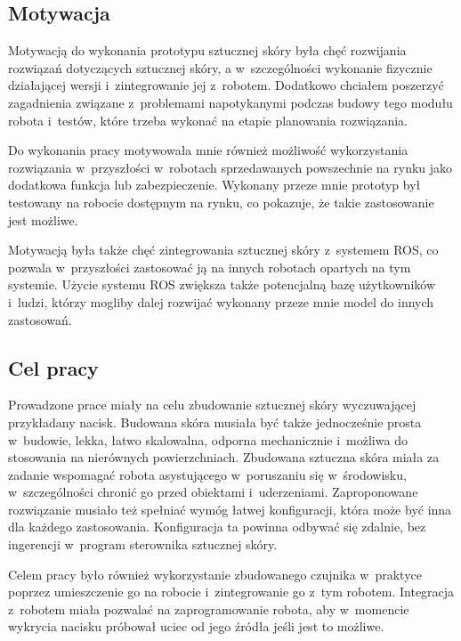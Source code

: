 \subsection{Motywacja}
Motywacją do wykonania prototypu sztucznej skóry była chęć rozwijania rozwiązań dotyczących sztucznej skóry, a w~szczególności wykonanie fizycznie działającej wersji i~zintegrowanie jej z~robotem. Dodatkowo chciałem poszerzyć zagadnienia związane z~problemami napotykanymi podczas budowy tego modułu robota i~testów, które trzeba wykonać na etapie planowania rozwiązania. 

Do wykonania pracy motywowała mnie również możliwość wykorzystania rozwiązania w~przyszłości w~robotach sprzedawanych powszechnie na rynku jako dodatkowa funkcja lub zabezpieczenie. Wykonany przeze mnie prototyp był testowany na robocie dostępnym na rynku, co pokazuje, że takie zastosowanie jest możliwe.

Motywacją była także chęć zintegrowania sztucznej skóry z~systemem ROS, co pozwala w~przyszłości zastosować ją na innych robotach opartych na tym systemie. 
Użycie systemu ROS zwiększa także potencjalną bazę użytkowników i~ludzi, którzy mogliby dalej rozwijać wykonany przeze mnie model do innych zastosowań.

\subsection{Cel pracy}
Prowadzone prace 
miały na celu zbudowanie sztucznej skóry wyczuwającej przykładany nacisk. Budowana skóra musiała być także jednocześnie prosta w~budowie, lekka, łatwo skalowalna, odporna mechanicznie i~możliwa do stosowania na nierównych powierzchniach.
Zbudowana sztuczna skóra miała za zadanie wspomagać robota asystującego w~poruszaniu się w~środowisku, w~szczególności chronić go przed obiektami i~uderzeniami. 
Zaproponowane rozwiązanie musiało też spełniać wymóg łatwej konfiguracji, która może być inna dla każdego zastosowania. Konfiguracja ta powinna odbywać się zdalnie, bez ingerencji w~program sterownika sztucznej skóry.

Celem pracy było również wykorzystanie zbudowanego czujnika w~praktyce poprzez umieszczenie go na robocie i~zintegrowanie go z~tym robotem. 
Integracja z~robotem miała pozwalać na zaprogramowanie robota, aby w~momencie wykrycia nacisku próbował uciec od jego źródła jeśli jest to możliwe.


